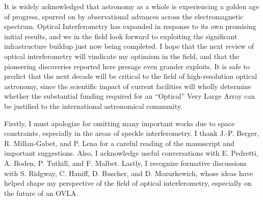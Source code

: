 \documentclass[12pt]{iopart}
\begin{document}
It is widely acknowledged that astronomy as a whole is experiencing a
golden age of progress, spurred on by observational advances across
the electromagnetic spectrum.  Optical Interferometry has expanded in
response to its own promising initial results, and we in the field
look forward to exploiting the significant infrastructure buildup just
now being completed.  I hope that the next review of optical
interferometry will vindicate my optimism in the field, and that the
pioneering discoveries reported here presage even grander exploits.
It is safe to predict that 
the next decade will be critical to the field of high-resolution
optical astronomy, since the scientific impact of current facilities
will wholly determine whether the substantial funding required for an
``Optical'' Very Large Array can be justified to the international
astronomical community.  

\ack 

Firstly, I must apologize for omitting many important works due to
space constraints, especially in the areas of speckle interferometry.
I thank J.-P. Berger, R. Millan-Gabet, and P. Lena for a careful
reading of the manuscript and important suggestions. Also, I
acknowledge useful conversations with E. Pedretti, A. Boden, 
P. Tuthill, and F.  Malbet.  
Lastly, I recognize formative discussions with S. Ridgway, C.
Haniff, D.  Buscher, and D.  Mozurkewich, whose ideas have helped
shape my perspective of the field of optical interferometry,
especially on the future of an OVLA.

\footnotesize


\end{document}
